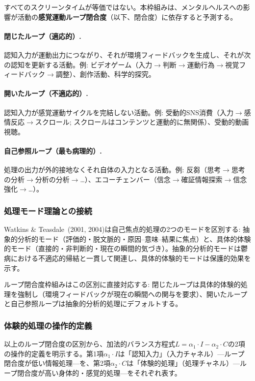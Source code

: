 \documentclass[a4paper,11pt,titlepage]{article}
\newcommand{\balanceL}{L}
\newcommand{\cogInput}{I}
\newcommand{\expProc}{C}
\begin{document}
すべてのスクリーンタイムが等価ではない。本枠組みは、メンタルヘルスへの影響が活動の\textbf{感覚運動ループ閉合度}（以下、閉合度）に依存すると予測する。

\paragraph{閉じたループ（適応的）.}
認知入力が運動出力につながり、それが環境フィードバックを生成し、それが次の認知を更新する活動。例: ビデオゲーム（入力$\to$判断$\to$運動行為$\to$視覚フィードバック$\to$調整）、創作活動、科学的探究。

\paragraph{開いたループ（不適応的）.}
認知入力が感覚運動サイクルを完結しない活動。例: 受動的SNS消費（入力$\to$感情反応$\to$スクロール; スクロールはコンテンツと運動的に無関係）、受動的動画視聴。

\paragraph{自己参照ループ（最も病理的）.}
処理の出力が外的接地なくそれ自体の入力となる活動。例: 反芻（思考$\to$思考の分析$\to$分析の分析$\to$\ldots）、エコーチェンバー（信念$\to$確証情報探索$\to$信念強化$\to$\ldots）。

\subsubsection{処理モード理論との接続}

Watkins \& Teasdale~(2001, 2004)は自己焦点的処理の2つのモードを区別する: 抽象的分析的モード（評価的・脱文脈的・原因--意味--結果に焦点）と、具体的体験的モード（直接的・非判断的・現在の瞬間的気づき）。抽象的分析的モードは鬱病における不適応的帰結と一貫して関連し、具体的体験的モードは保護的効果を示す。

ループ閉合度枠組みはこの区別に直接対応する: 閉じたループは具体的体験的処理を強制し（環境フィードバックが現在の瞬間への関与を要求）、開いたループと自己参照ループは抽象的分析的処理にデフォルトする。

\subsubsection{体験的処理の操作的定義}

以上のループ閉合度の区別から、加法的バランス方程式$\balanceL = \alpha_1 \cdot \cogInput - \alpha_2 \cdot \expProc$の2項の操作的定義を明示する。第1項$\alpha_1 \cdot \cogInput$は「認知入力」（入力チャネル）---ループ閉合度が低い情報処理---を、第2項$\alpha_2 \cdot \expProc$は「体験的処理」（処理チャネル）---ループ閉合度が高い身体的・感覚的処理---をそれぞれ表す。
\end{document}
